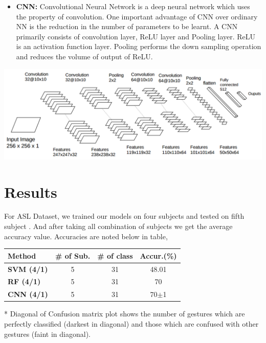 \documentclass[a0,landscape]{a0poster}
\begin{document}
\begin{multicols}{4}
\begin{itemize}
\item \textbf{CNN:} Convolutional Neural Network is a deep neural network which uses the property of convolution. One important advantage of CNN over ordinary NN is the reduction in the number of parameters to be learnt. A CNN primarily consists of convolution layer, ReLU layer and Pooling layer. ReLU is an activation function layer. Pooling performs the down sampling operation and reduces the volume of output of ReLU.
\end{itemize}
\vspace{1cm}

\begin{center}\vspace{1cm}
\includegraphics[width=0.99\linewidth]{cnn}
\end{center}\vspace{1cm}
\section*{Results}

For ASL Dataset, we trained our models on four subjects and tested on fifth subject . And after taking all combination of subjects we get the average accuracy value. Accuracies are noted below in table,


\begin{center}\vspace{1cm}
\begin{tabular}{@{}lccc@{}}
\toprule
Method & \multicolumn{1}{l}{\textbf{\# of Sub.}} & \multicolumn{1}{l}{\textbf{\# of class}} & \multicolumn{1}{l}{\textbf{Accur.(\%)}} \\ \midrule
\multicolumn{1}{|l|}{\textbf{SVM (4/1)}} & \multicolumn{1}{c|}{5} & \multicolumn{1}{c|}{31} & \multicolumn{1}{c|}{48.01} \\ \midrule
\textbf{RF (4/1)} & 5 & 31 & 70 \\ \midrule
\multicolumn{1}{|l|}{\textbf{CNN (4/1)}} & \multicolumn{1}{c|}{5} & \multicolumn{1}{c|}{31} & \multicolumn{1}{c|}{70$\pm$1} \\ \bottomrule
\end{tabular}
\end{center}
\vspace{3cm}*
Diagonal of Confusion matrix plot shows the number of gestures which are perfectly classified (darkest in diagonal) and those which are confused with other gestures (faint in diagonal).


\end{multicols}
\end{document}
